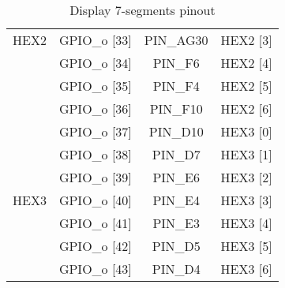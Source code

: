 \begin{table}[!htb]
\begin{tabular}{c c c c}
        HEX2   & \quad \quad GPIO\_o [33] & \quad \quad PIN\_AG30 & \quad \quad HEX2 [3]\\        
               & \quad \quad GPIO\_o [34] & \quad \quad PIN\_F6   & \quad \quad HEX2 [4]\\
               & \quad \quad GPIO\_o [35] & \quad \quad PIN\_F4    & \quad \quad HEX2 [5]\\
               & \quad \quad GPIO\_o [36] & \quad \quad PIN\_F10  & \quad \quad HEX2 [6]\\  
        \hline
               & \quad \quad GPIO\_o [37] & \quad \quad PIN\_D10 & \quad \quad HEX3 [0]\\
               & \quad \quad GPIO\_o [38] & \quad \quad PIN\_D7  & \quad \quad HEX3 [1]\\
               & \quad \quad GPIO\_o [39] & \quad \quad PIN\_E6  & \quad \quad HEX3 [2]\\
        HEX3   & \quad \quad GPIO\_o [40] & \quad \quad PIN\_E4  & \quad \quad HEX3 [3]\\        
               & \quad \quad GPIO\_o [41] & \quad \quad PIN\_E3  & \quad \quad HEX3 [4]\\
               & \quad \quad GPIO\_o [42] & \quad \quad PIN\_D5  & \quad \quad HEX3 [5]\\
               & \quad \quad GPIO\_o [43] & \quad \quad PIN\_D4  & \quad \quad HEX3 [6]\\
               
        
    \end{tabular}
    \caption{\label{tab:hex}Display 7-segments pinout}
\end{table}

